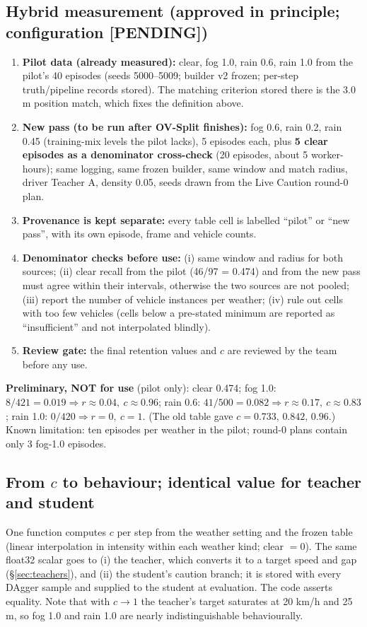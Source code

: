 \documentclass[11pt,a4paper]{article}
\newcommand{\tbd}{\textbf{[PENDING]}}
\begin{document}
\subsection{Hybrid measurement (approved in principle; configuration \tbd{})}
\begin{enumerate}[leftmargin=*]
\item \textbf{Pilot data (already measured):} clear, fog 1.0, rain 0.6, rain 1.0 from the pilot's 40 episodes (seeds 5000--5009; builder v2 frozen; per-step truth/pipeline records stored). The matching criterion stored there is the 3.0 m position match, which fixes the definition above.
\item \textbf{New pass (to be run after OV-Split finishes):} fog 0.6, rain 0.2, rain 0.45 (training-mix levels the pilot lacks), 5 episodes each, plus \textbf{5 clear episodes as a denominator cross-check} (20 episodes, about 5 worker-hours); same logging, same frozen builder, same window and match radius, driver Teacher A, density 0.05, seeds drawn from the Live Caution round-0 plan.
\item \textbf{Provenance is kept separate:} every table cell is labelled ``pilot'' or ``new pass'', with its own episode, frame and vehicle counts.
\item \textbf{Denominator checks before use:} (i) same window and radius for both sources; (ii) clear recall from the pilot (46/97 = 0.474) and from the new pass must agree within their intervals, otherwise the two sources are not pooled; (iii) report the number of vehicle instances per weather; (iv) rule out cells with too few vehicles (cells below a pre-stated minimum are reported as ``insufficient'' and not interpolated blindly).
\item \textbf{Review gate:} the final retention values and $c$ are reviewed by the team before any use.
\end{enumerate}
\textbf{Preliminary, NOT for use} (pilot only): clear 0.474; fog 1.0: $8/421=0.019\Rightarrow r\approx0.04,\ c\approx0.96$; rain 0.6: $41/500=0.082\Rightarrow r\approx0.17,\ c\approx0.83$; rain 1.0: $0/420\Rightarrow r=0,\ c=1$. (The old table gave $c=0.733,\,0.842,\,0.96$.) Known limitation: ten episodes per weather in the pilot; round-0 plans contain only 3 fog-1.0 episodes.

\subsection{From $c$ to behaviour; identical value for teacher and student}
One function computes $c$ per step from the weather setting and the frozen table (linear interpolation in intensity within each weather kind; clear $=0$). The same float32 scalar goes to (i) the teacher, which converts it to a target speed and gap (\S\ref{sec:teachers}), and (ii) the student's caution branch; it is stored with every DAgger sample and supplied to the student at evaluation. The code asserts equality. Note that with $c\to1$ the teacher's target saturates at 20 km/h and 25 m, so fog 1.0 and rain 1.0 are nearly indistinguishable behaviourally.
\end{document}

